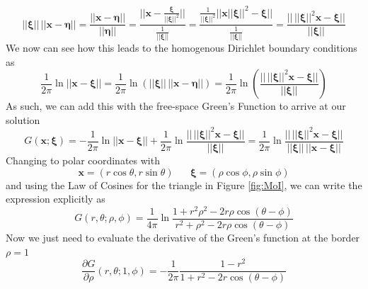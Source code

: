 \documentclass{article}
\newcommand{\pd}[2]{\frac{\partial #1}{\partial #2}}
\newcommand{\vb}[1]{\mathbf{ #1}}
\newcommand{\ggf}{G(\vb{x}; \boldsymbol{\xi})}
\newcommand{\norm}[1]{|| #1 ||}
\newcommand{\bs}[1]{\boldsymbol{#1}}
\numberwithin{equation}{section}
\begin{document}
\begin{equation*}
    \norm{\bs{\xi}}
\,\norm{\vb{x}-\bs{\eta}} = \frac{\norm{\vb{x}-\bs{\eta}}}{\norm{\bs{\eta}}} = \frac{\norm{\vb{x}-\frac{\bs{\xi}}{\norm{\bs{\xi}}^2}}}{\frac{1}{\norm{\bs{\xi}}}}=\frac{\frac{1}{\norm{\bs{\xi}}^2}\norm{\vb{x}\norm{\bs{\xi}}^2-\bs{\xi}}}{\frac{1}{\norm{\bs{\xi}}}} = \frac{\norm{\,\norm{\bs{\xi}}^2\vb{x}-\bs{\xi}}}{\norm{\bs{\xi}}}
\end{equation*}
We now can see how this leads to the homogenous Dirichlet boundary conditions as
\begin{equation}
    \frac{1}{2\pi}\ln \norm{\vb{x} - \bs{\xi}} =\frac{1}{2\pi}\ln \left(  \norm{\bs{\xi}}
\,\norm{\vb{x}-\bs{\eta}}\right) = \frac{1}{2\pi}\ln \left( \frac{\norm{\,\norm{\bs{\xi}}^2\vb{x}-\bs{\xi}}}{\norm{\bs{\xi}}} \right)
\end{equation}
As such, we can add this with the free-space Green's Function to arrive at our solution
\begin{equation}
    \ggf = -\frac{1}{2\pi} \ln \norm{\vb{x} - \bs{\xi}} + \frac{1}{2\pi}\ln \frac{\norm{\,\norm{\bs{\xi}}^2\vb{x}-\bs{\xi}}}{\norm{\bs{\xi}}} = \frac{1}{2\pi} \ln \frac{\norm{\,\norm{\bs{\xi}}^2\vb{x}-\bs{\xi}}}{\norm{\bs{\xi}}\, \norm{\vb{x}-\bs{\xi}}}
\end{equation}
Changing to polar coordinates with 
\begin{equation*}
    \vb{x} = (r \cos \theta, r\sin\theta) \hspace{20pt} \bs{\xi} = (\rho \cos \phi, \rho \sin \phi)
\end{equation*}
and using the Law of Cosines for the triangle in Figure \ref{fig:MoI}, we can write the expression explicitly as 
\begin{equation}
    G(r,\theta; \rho,\phi)=\frac{1}{4\pi} \ln \frac{1+r^2\rho ^2-2r\rho \cos(\theta-\phi)}{r^2+\rho^2-2r\rho \cos(\theta - \phi)} \label{eq:2.45}
\end{equation}
Now we just need to evaluate the derivative of the Green's function at the border $\rho = 1$
\begin{equation}
    \pd{G}{\rho}(r,\theta;1,\phi) =-\frac{1}{2\pi}\frac{1-r^2}{1+r^2-2r\cos (\theta - \phi)} \label{eq:2.46}
\end{equation}
\end{document}
